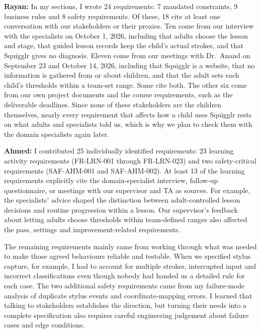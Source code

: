 \documentclass[12pt]{article}
\renewcommand{\_}{\textunderscore\allowbreak}%
\begin{document}
\begin{enumerate}
\textbf{Rayan:} In my sections, I wrote 24 requirements: 7 mandated constraints,
9 business rules and 8 safety requirements. Of these, 18 cite at least one
conversation with our stakeholders or their proxies. Ten come from our interview
with the specialists on October 1, 2026, including that adults choose the lesson
and stage, that guided lesson records keep the child's actual strokes, and that
Squigglr gives no diagnosis. Eleven come from our meetings with Dr.~Anand on
September 23 and October 14, 2026, including that Squigglr is a website, that no
information is gathered from or about children, and that the adult sets each
child's thresholds within a team-set range. Some cite both. The other six come
from our own project documents and the course requirements, such as the
deliverable deadlines. Since none of these stakeholders are the children
themselves, nearly every requirement that affects how a child uses Squigglr
rests on what adults and specialists told us, which is why we plan to check them
with the domain specialists again later.

\textbf{Ahmed:} I contributed 25 individually identified requirements: 23
learning activity requirements (FR-LRN-001 through FR-LRN-023) and two
safety-critical requirements (SAF-AHM-001 and SAF-AHM-002). At least 13 of the
learning requirements explicitly cite the domain-specialist interview, follow-up
questionnaire, or meetings with our supervisor and TA as sources. For example,
the specialists' advice shaped the distinction between adult-controlled lesson
decisions and routine progression within a lesson. Our supervisor's feedback
about letting adults choose thresholds within team-defined ranges also affected
the pass, settings and improvement-related requirements.

The remaining requirements mainly came from working through what was needed to
make those agreed behaviours reliable and testable. When we specified stylus
capture, for example, I had to account for multiple strokes, interrupted input
and incorrect classifications even though nobody had handed us a detailed rule
for each case. The two additional safety requirements came from my failure-mode
analysis of duplicate stylus events and coordinate-mapping errors. I learned
that talking to stakeholders establishes the direction, but turning their needs
into a complete specification also requires careful engineering judgement about
failure cases and edge conditions.


\end{enumerate}
\end{document}
